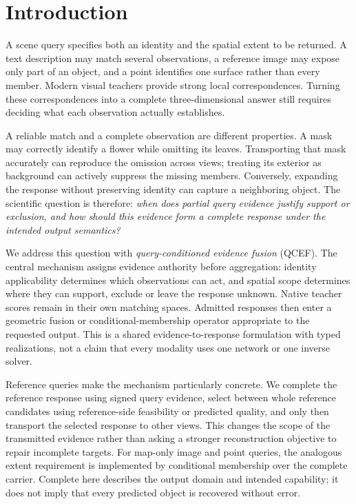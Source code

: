\section{Introduction}
A scene query specifies both an identity and the spatial extent to be returned.
A text description may match several observations, a reference image may expose
only part of an object, and a point identifies one surface rather than every
member. Modern visual teachers provide strong local correspondences. Turning
these correspondences into a complete three-dimensional answer still requires
deciding what each observation actually establishes.

A reliable match and a complete observation are different properties. A mask
may correctly identify a flower while omitting its leaves. Transporting that
mask accurately can reproduce the omission across views; treating its exterior
as background can actively suppress the missing members. Conversely, expanding
the response without preserving identity can capture a neighboring object.
The scientific question is therefore: \emph{when does partial query evidence
justify support or exclusion, and how should this evidence form a complete
response under the intended output semantics?}

We address this question with \emph{query-conditioned evidence fusion} (QCEF).
The central mechanism assigns evidence authority before aggregation: identity
applicability determines which observations can act, and spatial scope
determines where they can support, exclude or leave the response unknown.
Native teacher scores remain in their own matching spaces. Admitted responses
then enter a geometric fusion or conditional-membership operator appropriate
to the requested output. This is a shared evidence-to-response formulation
with typed realizations, not a claim that every modality uses one network or
one inverse solver.

Reference queries make the mechanism particularly concrete. We complete the
reference response using signed query evidence, select between whole reference
candidates using reference-side feasibility or predicted quality, and only then
transport the selected response to other views. This changes the scope of the
transmitted evidence rather than asking a stronger reconstruction objective to
repair incomplete targets. For map-only image and point queries, the analogous
extent requirement is implemented by conditional membership over the complete
carrier. Complete here describes the output domain and intended capability;
it does not imply that every predicted object is recovered without error.


